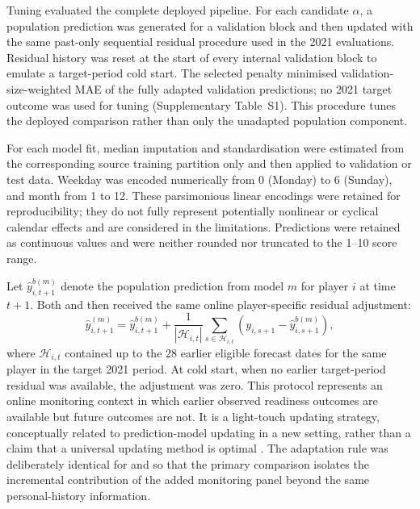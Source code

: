Tuning evaluated the complete deployed pipeline. For each candidate $\alpha$, a population prediction was generated for a validation block and then updated with the same past-only sequential residual procedure used in the 2021 evaluations. Residual history was reset at the start of every internal validation block to emulate a target-period cold start. The selected penalty minimised validation-size-weighted MAE of the fully adapted validation predictions; no 2021 target outcome was used for tuning (Supplementary Table~S1). This procedure tunes the deployed comparison rather than only the unadapted population component.

For each model fit, median imputation and standardisation were estimated from the corresponding source training partition only and then applied to validation or test data. Weekday was encoded numerically from 0 (Monday) to 6 (Sunday), and month from 1 to 12. These parsimonious linear encodings were retained for reproducibility; they do not fully represent potentially nonlinear or cyclical calendar effects and are considered in the limitations. Predictions were retained as continuous values and were neither rounded nor truncated to the 1--10 score range.

Let $\widehat{y}^{b(m)}_{i,t+1}$ denote the population prediction from model $m$ for player $i$ at time $t+1$. Both \Pzero{} and \Pone{} then received the same online player-specific residual adjustment:
\begin{equation}
\widehat{y}^{(m)}_{i,t+1} = \widehat{y}^{b(m)}_{i,t+1} + \frac{1}{|\mathcal{H}_{i,t}|}\sum_{s \in \mathcal{H}_{i,t}}\left(y_{i,s+1} - \widehat{y}^{b(m)}_{i,s+1}\right),
\end{equation}
where $\mathcal{H}_{i,t}$ contained up to the 28 earlier eligible forecast dates for the same player in the target 2021 period. At cold start, when no earlier target-period residual was available, the adjustment was zero. This protocol represents an online monitoring context in which earlier observed readiness outcomes are available but future outcomes are not. It is a light-touch updating strategy, conceptually related to prediction-model updating in a new setting, rather than a claim that a universal updating method is optimal \citep{Janssen2008}. The adaptation rule was deliberately identical for \Pzero{} and \Pone{} so that the primary comparison isolates the incremental contribution of the added monitoring panel beyond the same personal-history information.

